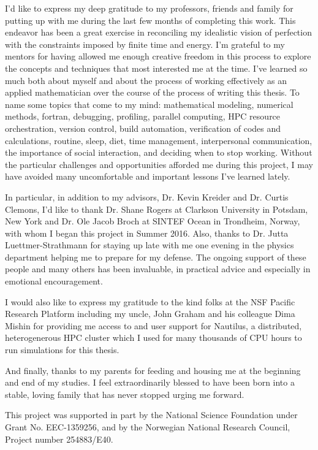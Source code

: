 \begin{acknowledgements}
I'd like to express my deep gratitude to my professors, friends and family for putting up with me during the last few months of completing this work.
This endeavor has been a great exercise in reconciling my idealistic vision of perfection with the constraints imposed by finite time and energy.
I'm grateful to my mentors for having allowed me enough creative freedom in this process to explore the concepts and techniques that most interested me at the time.
I've learned so much both about myself and about the process of working effectively as an applied mathematician over the course of the process of writing this thesis.
To name some topics that come to my mind: mathematical modeling, numerical methods, fortran, debugging, profiling, parallel computing, HPC resource orchestration, version control, build automation, verification of codes and calculations, routine, sleep, diet, time management, interpersonal communication, the importance of social interaction, and deciding when to stop working.
Without the particular challenges and opportunities afforded me during this project, I may have avoided many uncomfortable and important lessons I've learned lately.

In particular, in addition to my advisors, Dr. Kevin Kreider and Dr. Curtis Clemons, I'd like to thank Dr. Shane Rogers at Clarkson University in Potsdam, New York and Dr. Ole Jacob Broch at SINTEF Ocean in Trondheim, Norway, with whom I began this project in Summer 2016.
Also, thanks to Dr. Jutta Luettmer-Strathmann for staying up late with me one evening in the physics department helping me to prepare for my defense.
The ongoing support of these people and many others has been invaluable, in practical advice and especially in emotional encouragement.

I would also like to express my gratitude to the kind folks at the NSF Pacific Research Platform including my uncle, John Graham and his colleague Dima Mishin for providing me access to and user support for Nautilus, a distributed, heterogenerous HPC cluster which I used for many thousands of CPU hours to run simulations for this thesis.

And finally, thanks to my parents for feeding and housing me at the beginning and end of my studies.
I feel extraordinarily blessed to have been born into a stable, loving family that has never stopped urging me forward.

\vfill

This project was supported in part by the National Science
Foundation under Grant No. EEC-1359256, and by the Norwegian National Research
Council, Project number 254883/E40.

\end{acknowledgements}






